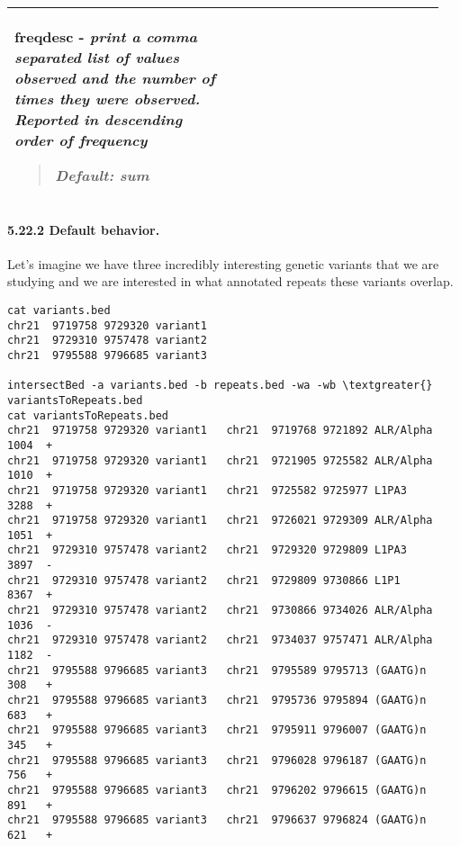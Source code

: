 \documentclass[letterpaper,10pt,english]{sphinxmanual}
\begin{document}
\begin{tabular}{|p{0.475\linewidth}|p{0.475\linewidth}|}
\begin{DUlineblock}{0em}
\item[] \textbf{freqdesc} - \emph{print a comma separated list of values observed and the number of times they were observed. Reported in descending order of frequency}
\end{DUlineblock}
\begin{quote}

\begin{DUlineblock}{0em}
\item[] \emph{Default: sum}
\end{DUlineblock}
\end{quote}
\\\hline
\end{tabular}



\paragraph{5.22.2 Default behavior.}
\label{content/groupBy:default-behavior}
Let's imagine we have three incredibly interesting genetic variants that we are studying and we are
interested in what annotated repeats these variants overlap.

\begin{Verbatim}[commandchars=\\\{\}]
cat variants.bed
chr21  9719758 9729320 variant1
chr21  9729310 9757478 variant2
chr21  9795588 9796685 variant3

intersectBed -a variants.bed -b repeats.bed -wa -wb \textgreater{} variantsToRepeats.bed
cat variantsToRepeats.bed
chr21  9719758 9729320 variant1   chr21  9719768 9721892 ALR/Alpha   1004  +
chr21  9719758 9729320 variant1   chr21  9721905 9725582 ALR/Alpha   1010  +
chr21  9719758 9729320 variant1   chr21  9725582 9725977 L1PA3       3288  +
chr21  9719758 9729320 variant1   chr21  9726021 9729309 ALR/Alpha   1051  +
chr21  9729310 9757478 variant2   chr21  9729320 9729809 L1PA3       3897  -
chr21  9729310 9757478 variant2   chr21  9729809 9730866 L1P1        8367  +
chr21  9729310 9757478 variant2   chr21  9730866 9734026 ALR/Alpha   1036  -
chr21  9729310 9757478 variant2   chr21  9734037 9757471 ALR/Alpha   1182  -
chr21  9795588 9796685 variant3   chr21  9795589 9795713 (GAATG)n    308   +
chr21  9795588 9796685 variant3   chr21  9795736 9795894 (GAATG)n    683   +
chr21  9795588 9796685 variant3   chr21  9795911 9796007 (GAATG)n    345   +
chr21  9795588 9796685 variant3   chr21  9796028 9796187 (GAATG)n    756   +
chr21  9795588 9796685 variant3   chr21  9796202 9796615 (GAATG)n    891   +
chr21  9795588 9796685 variant3   chr21  9796637 9796824 (GAATG)n    621   +
\end{Verbatim}
\end{document}
